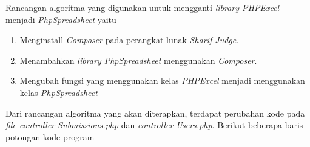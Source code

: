 Rancangan algoritma yang digunakan untuk mengganti \textit{library PHPExcel} menjadi \textit{PhpSpreadsheet} yaitu
\begin{enumerate}
	\item Menginstall \textit{Composer} pada perangkat lunak \textit{Sharif Judge}.
	\item Menambahkan \textit{library PhpSpreadsheet} menggunakan \textit{Composer}.
	\item Mengubah fungsi yang menggunakan kelas \textit{PHPExcel} menjadi menggunakan kelas \textit{PhpSpreadsheet}
\end{enumerate}

Dari rancangan algoritma yang akan diterapkan, terdapat perubahan kode pada \textit{file controller Submissions.php} dan \textit{controller Users.php}. Berikut beberapa baris potongan kode program

